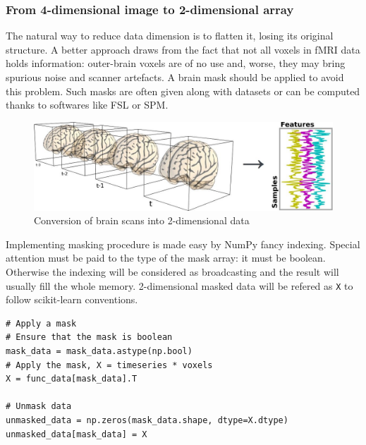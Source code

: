\documentclass{frontiersSCNS} %
\newcounter{x}
\newcounter{y}
\newcounter{z}
\begin{document}
\subsubsection{From 4-dimensional image to 2-dimensional array}

The natural way to reduce data dimension is to flatten it, losing its original
structure. A better approach draws from the fact that not all voxels in fMRI data
holds information: outer-brain voxels are of no
use and, worse, they may bring spurious noise and scanner artefacts.
A brain mask should be applied to avoid this problem. Such masks
are often given along with datasets or can be computed thanks to softwares like
FSL or SPM.\\

\begin{figure}[hbtp]
    \begin{center}
        \includegraphics[width=.5\linewidth]{img/niimgs.jpg}
    \end{center}
    \caption{Conversion of brain scans into 2-dimensional data}
    \label{fig:niimg}
\end{figure}

Implementing masking procedure is made easy by NumPy fancy
indexing. Special attention must be paid to the type of the mask array: it must
be boolean. Otherwise the indexing will be considered as broadcasting and the
result will usually fill the whole memory.
2-dimensional masked data will be refered as \texttt{X} to follow scikit-learn
conventions.

\begin{lstlisting}
# Apply a mask
# Ensure that the mask is boolean
mask_data = mask_data.astype(np.bool)
# Apply the mask, X = timeseries * voxels
X = func_data[mask_data].T

# Unmask data
unmasked_data = np.zeros(mask_data.shape, dtype=X.dtype)
unmasked_data[mask_data] = X
\end{lstlisting}



\end{document}
